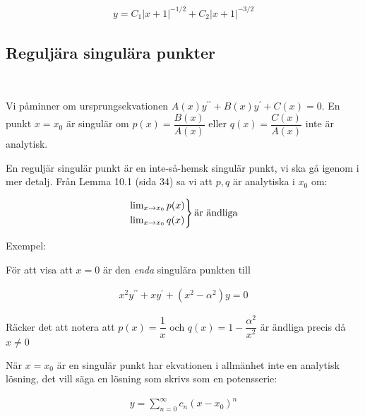 \begin{equation*}
  \begin{gathered}
    y = C_1\left|x+1\right|^{-1/2}+C_2\left|x+1\right|^{-3/2}
  \end{gathered}
\end{equation*}

\newpage

\subsection{Reguljära singulära punkter}\hfill\\
\par\bigskip

\noindent Vi påminner om ursprungsekvationen $A(x)y^{\prime\prime}+B(x)y^{\prime}+C(x)=0$. En punkt $x=x_0$ är singulär om $p(x)=\dfrac{B(x)}{A(x)}$ eller $q(x)=\dfrac{C(x)}{A(x)}$ inte är analytisk.
\par\bigskip
\noindent En reguljär singulär punkt är en inte-så-hemsk singulär punkt, vi ska gå igenom i mer detalj. Från Lemma 10.1 (sida 34) sa vi att $p, q$ är analytiska i $x_0$ om:


\begin{equation*}
  \begin{gathered}
    \begin{rcases*}
      \lim_{x\to x_0} p(x)\\
      \lim_{x\to x_0}q(x)
    \end{rcases*}\text{är ändliga}
  \end{gathered}
\end{equation*}
\par\bigskip
\noindent Exempel:\par
\noindent För att visa att $x=0$ är den \textit{enda} singulära punkten till


\begin{equation*}
  \begin{gathered}
    x^2y^{\prime\prime}+xy^{\prime}+(x^2-\alpha^2)y=0
  \end{gathered}
\end{equation*}\par
\noindent Räcker det att notera att $p(x)=\dfrac{1}{x}$ och $q(x)=1-\dfrac{\alpha^2}{x^2}$ är ändliga precis då $x\neq0$
\par\bigskip
\noindent När $x=x_0$ är en singulär punkt har ekvationen i allmänhet inte en analytisk lösning, det vill säga en lösning som skrivs som en potensserie:

\begin{equation*}
  \begin{gathered}
    y = \sum_{n=0}^{\infty}c_n(x-x_0)^n
  \end{gathered}
\end{equation*}
\par\bigskip

